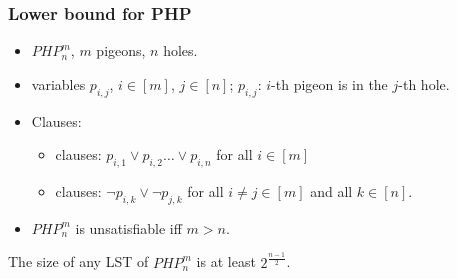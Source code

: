 \begin{frame}
    \frametitle{Lower bound for PHP}

    \begin{itemize}
		\item $PHP^m_n$, $m$ pigeons, $n$ holes. 
		\item variables $p_{i, j}$, $i \in [m]$, $j \in [n]$; 
			$p_{i, j}$: $i$-th pigeon is in the $j$-th hole.
		\item Clauses: 
			\begin{itemize}
				\item {} clauses: $p_{i, 1} \lor p_{i, 2} \dots
		            \lor p_{i, n}$ for all $i \in [m]$ 
				\item {} clauses: $\lnot p_{i, k} \lor \lnot
            		p_{j, k}$ for all $i \neq j \in [m]$ and all $k \in [n]$.
			\end{itemize}
		\item $PHP^m_n$ is unsatisfiable iff $m > n$.

	\end{itemize}
    
	\pause

    \begin{theorem}
        The size of any LST of $PHP^m_n$ is at least $2^{\frac{n - 1}{2}}$.
    \end{theorem}

\end{frame}



